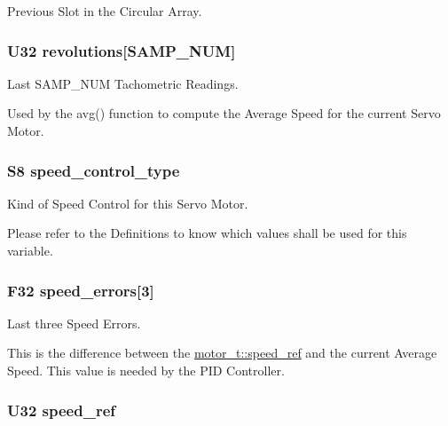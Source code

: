 Previous Slot in the Circular Array. 

\hypertarget{structmotor__t_a5c97ee29120bfb2cc43ca32bbcf0d766}{
\subsubsection[{revolutions}]{\setlength{\rightskip}{0pt plus 5cm}U32 {\bf revolutions}\mbox{[}SAMP\_\-NUM\mbox{]}}}
\label{structmotor__t_a5c97ee29120bfb2cc43ca32bbcf0d766}


Last SAMP\_\-NUM Tachometric Readings. 

Used by the avg() function to compute the Average Speed for the current Servo Motor. \hypertarget{structmotor__t_a5b17b9088a3d9bb06293673a7077411c}{
\subsubsection[{speed\_\-control\_\-type}]{\setlength{\rightskip}{0pt plus 5cm}S8 {\bf speed\_\-control\_\-type}}}
\label{structmotor__t_a5b17b9088a3d9bb06293673a7077411c}


Kind of Speed Control for this Servo Motor. 

Please refer to the Definitions to know which values shall be used for this variable. \hypertarget{structmotor__t_aaa9b86dcf97cbd4ca2af18ca41a17025}{
\subsubsection[{speed\_\-errors}]{\setlength{\rightskip}{0pt plus 5cm}F32 {\bf speed\_\-errors}\mbox{[}3\mbox{]}}}
\label{structmotor__t_aaa9b86dcf97cbd4ca2af18ca41a17025}


Last three Speed Errors. 

This is the difference between the \hyperlink{structmotor__t_a3fc8cc6c0b771418981cb5df670e3d6c}{motor\_\-t::speed\_\-ref} and the current Average Speed. This value is needed by the PID Controller. \hypertarget{structmotor__t_a3fc8cc6c0b771418981cb5df670e3d6c}{
\subsubsection[{speed\_\-ref}]{\setlength{\rightskip}{0pt plus 5cm}U32 {\bf speed\_\-ref}}}
\label{structmotor__t_a3fc8cc6c0b771418981cb5df670e3d6c}


